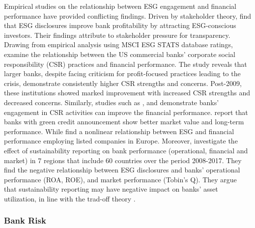 \documentclass[
  authoryear]{elsarticle}
\begin{document}
Empirical studies on the relationship between ESG engagement and
financial performance have provided conflicting findings. Driven by
stakeholder theory, \citet{WU2013} find that ESG disclosures improve
bank profitability by attracting ESG-conscious investors. Their findings
attribute to stakeholder pressure for transparency. Drawing from
empirical analysis using MSCI ESG STATS database ratings,
\citet{CORNETT2016} examine the relationship between the US commercial
banks' corporate social responsibility (CSR) practices and financial
performance. The study reveals that larger banks, despite facing
criticism for profit-focused practices leading to the crisis,
demonstrate consistently higher CSR strengths and concerns. Post-2009,
these institutions showed marked improvement with increased CSR
strengths and decreased concerns. Similarly, studies such as
\citet{CARNEVALE2014}, \citet{SHEN2016} and \citet{BUALLAY2021}
demonstrate banks' engagement in CSR activities can improve the
financial performance. \citet{TIAN2023} report that banks with green
credit announcement show better market value and long-term performance.
While \citet{FERRERO2016} find a nonlinear relationship between ESG and
financial performance employing listed companies in Europe. Moreover,
\citet{BUALLAY2023} investigate the effect of sustainability reporting
on bank performance (operational, financial and market) in 7 regions
that include 60 countries over the period 2008-2017. They find the
negative relationship between ESG disclosures and banks' operational
performance (ROA, ROE), and market performance (Tobin's Q). They argue
that sustainability reporting may have negative impact on banks' asset
utilization, in line with the trad-off theory \citep[see][]{LEE2009}.

\subsubsection{Bank Risk}\label{bank-risk}
\end{document}
